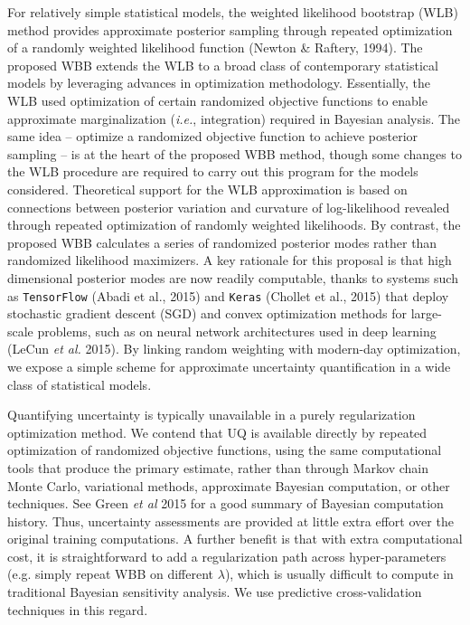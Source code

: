 \documentclass[12pt]{TD-CJS}
\begin{document}
For relatively simple statistical models, the weighted likelihood bootstrap (WLB) method provides
approximate posterior sampling through repeated optimization of a randomly weighted likelihood function (Newton \& Raftery, 1994).
The proposed WBB extends the WLB to a broad class of  contemporary statistical models by leveraging advances in optimization methodology.
Essentially, the WLB used optimization of certain 
randomized objective functions to enable approximate marginalization ({\em i.e.}, integration) 
required in Bayesian analysis.  The same idea -- optimize a randomized objective function to 
achieve  posterior sampling -- is at the heart of the proposed WBB method, though some changes to the WLB procedure are required to 
carry out this program for the models considered.
Theoretical support for the WLB approximation is based on  connections between posterior variation and curvature of 
log-likelihood revealed through repeated optimization of randomly weighted likelihoods. 
 By contrast, the proposed WBB calculates a series of
randomized  posterior modes rather than randomized likelihood maximizers. A key rationale for this proposal is  that 
high dimensional posterior modes are now readily computable, thanks to systems such as \verb+TensorFlow+ (Abadi et al., 2015) and 
\verb+Keras+ (Chollet et al., 2015)
that deploy stochastic gradient descent (SGD) and convex optimization methods for large-scale
problems, such as on neural network architectures used in deep learning (LeCun {\em et al.} 2015).
By linking random weighting with modern-day optimization, we expose a simple scheme
for approximate uncertainty quantification in a wide class of statistical models.

Quantifying uncertainty is typically unavailable in a purely regularization optimization method. 
We contend that UQ is available directly by repeated optimization of randomized objective functions, using the same
computational tools that produce the primary estimate,  rather than through Markov
chain Monte Carlo, variational methods,  approximate Bayesian computation, or other techniques. See Green {\em et al} 2015 for a good summary of Bayesian computation history. Thus, uncertainty assessments are provided at little extra effort over the original
training computations.  A further benefit is that with extra computational cost, it is straightforward to add a regularization path 
across hyper-parameters (e.g. simply repeat WBB on different $\lambda$), which is usually difficult to compute in traditional Bayesian
sensitivity analysis.  We use predictive cross-validation techniques in this regard.
\end{document}
